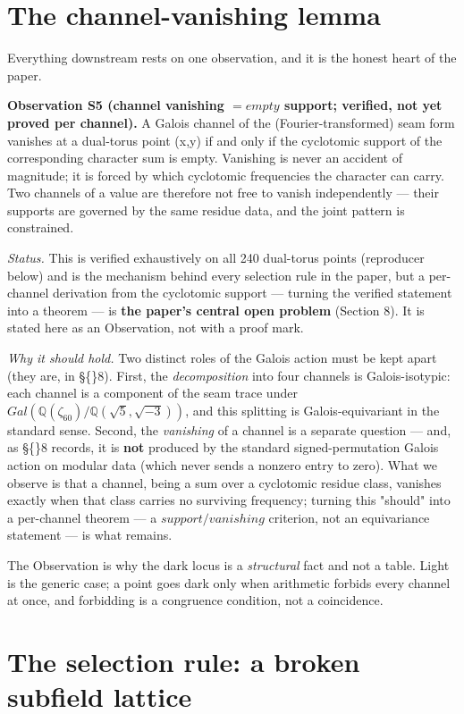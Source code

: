 \documentclass[11pt]{article}
\theoremstyle{plain}
\theoremstyle{definition}
\theoremstyle{remark}
\begin{document}
\section{The channel-vanishing lemma}

Everything downstream rests on one observation, and it is the honest heart of the paper.

\textbf{Observation S5 (channel vanishing \(= empty\) support; verified, not yet proved per channel).} A Galois channel of the (Fourier-transformed) seam form vanishes at a dual-torus point (x,y) if and only if the cyclotomic support of the corresponding character sum is empty. Vanishing is never an accident of magnitude; it is forced by which cyclotomic frequencies the character can carry. Two channels of a value are therefore not free to vanish independently — their supports are governed by the same residue data, and the joint pattern is constrained.

\emph{Status.} This is verified exhaustively on all 240 dual-torus points (reproducer below) and is the mechanism behind every selection rule in the paper, but a per-channel derivation from the cyclotomic support — turning the verified statement into a theorem — is \textbf{the paper's central open problem} (Section 8). It is stated here as an Observation, not with a proof mark.

\emph{Why it should hold.} Two distinct roles of the Galois action must be kept apart (they are, in \S\{\}8). First, the \emph{decomposition} into four channels is Galois-isotypic: each channel is a component of the seam trace under \(Gal(\mathbb{Q}(\zeta _{60})/\mathbb{Q}(\sqrt{5},\sqrt{-3}))\), and this splitting is Galois-equivariant in the standard sense. Second, the \emph{vanishing} of a channel is a separate question — and, as \S\{\}8 records, it is \textbf{not} produced by the standard signed-permutation Galois action on modular data (which never sends a nonzero entry to zero). What we observe is that a channel, being a sum over a cyclotomic residue class, vanishes exactly when that class carries no surviving frequency; turning this "should" into a per-channel theorem — a \(support/vanishing\) criterion, not an equivariance statement — is what remains.

The Observation is why the dark locus is a \emph{structural} fact and not a table. Light is the generic case; a point goes dark only when arithmetic forbids every channel at once, and forbidding is a congruence condition, not a coincidence.

\section{The selection rule: a broken subfield lattice}
\end{document}
